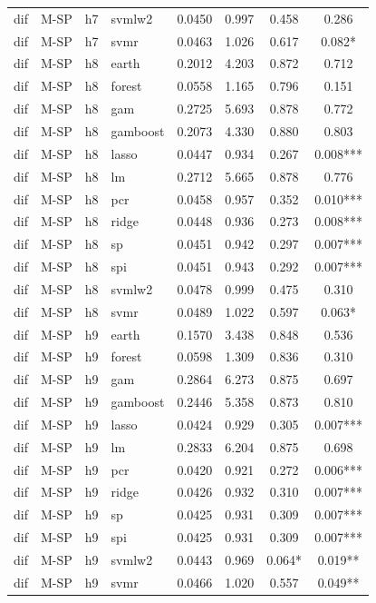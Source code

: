 \begin{ThreePartTable}
\begin{longtable}[t]{llclcccc}
dif & M-SP & h7 & svmlw2 & 0.0450 & 0.997 & 0.458 & 0.286\\
dif & M-SP & h7 & svmr & 0.0463 & 1.026 & 0.617 & 0.082*\\
\addlinespace
dif & M-SP & h8 & earth & 0.2012 & 4.203 & 0.872 & 0.712\\
dif & M-SP & h8 & forest & 0.0558 & 1.165 & 0.796 & 0.151\\
dif & M-SP & h8 & gam & 0.2725 & 5.693 & 0.878 & 0.772\\
dif & M-SP & h8 & gamboost & 0.2073 & 4.330 & 0.880 & 0.803\\
dif & M-SP & h8 & lasso & 0.0447 & 0.934 & 0.267 & 0.008***\\
dif & M-SP & h8 & lm & 0.2712 & 5.665 & 0.878 & 0.776\\
dif & M-SP & h8 & pcr & 0.0458 & 0.957 & 0.352 & 0.010***\\
dif & M-SP & h8 & ridge & 0.0448 & 0.936 & 0.273 & 0.008***\\
dif & M-SP & h8 & sp & 0.0451 & 0.942 & 0.297 & 0.007***\\
dif & M-SP & h8 & spi & 0.0451 & 0.943 & 0.292 & 0.007***\\
dif & M-SP & h8 & svmlw2 & 0.0478 & 0.999 & 0.475 & 0.310\\
dif & M-SP & h8 & svmr & 0.0489 & 1.022 & 0.597 & 0.063*\\
\addlinespace
dif & M-SP & h9 & earth & 0.1570 & 3.438 & 0.848 & 0.536\\
dif & M-SP & h9 & forest & 0.0598 & 1.309 & 0.836 & 0.310\\
dif & M-SP & h9 & gam & 0.2864 & 6.273 & 0.875 & 0.697\\
dif & M-SP & h9 & gamboost & 0.2446 & 5.358 & 0.873 & 0.810\\
dif & M-SP & h9 & lasso & 0.0424 & 0.929 & 0.305 & 0.007***\\
dif & M-SP & h9 & lm & 0.2833 & 6.204 & 0.875 & 0.698\\
dif & M-SP & h9 & pcr & 0.0420 & 0.921 & 0.272 & 0.006***\\
dif & M-SP & h9 & ridge & 0.0426 & 0.932 & 0.310 & 0.007***\\
dif & M-SP & h9 & sp & 0.0425 & 0.931 & 0.309 & 0.007***\\
dif & M-SP & h9 & spi & 0.0425 & 0.931 & 0.309 & 0.007***\\
dif & M-SP & h9 & svmlw2 & 0.0443 & 0.969 & 0.064* & 0.019**\\
dif & M-SP & h9 & svmr & 0.0466 & 1.020 & 0.557 & 0.049**\\

\end{longtable}
\end{ThreePartTable}
